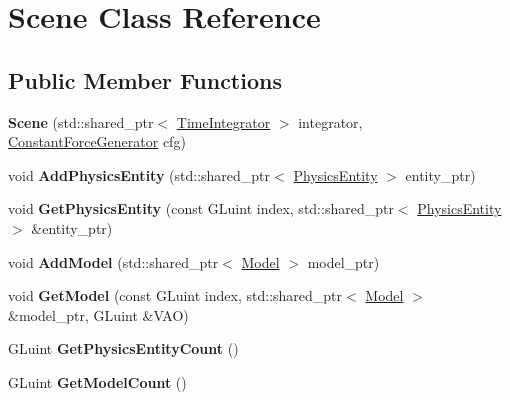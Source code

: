 \hypertarget{classScene}{}\section{Scene Class Reference}
\label{classScene}
\subsection*{Public Member Functions}
\begin{DoxyCompactItemize}
\item 
\mbox{\label{classScene_a0a3d0bcafa5f18639e2af91c4c43115b}} 
{\bfseries Scene} (std\+::shared\+\_\+ptr$<$ \hyperlink{classTimeIntegrator}{Time\+Integrator} $>$ integrator, \hyperlink{classConstantForceGenerator}{Constant\+Force\+Generator} cfg)
\item 
\mbox{\label{classScene_a18477e2b5b504b46f3e7d37908abb98d}} 
void {\bfseries Add\+Physics\+Entity} (std\+::shared\+\_\+ptr$<$ \hyperlink{classPhysicsEntity}{Physics\+Entity} $>$ entity\+\_\+ptr)
\item 
\mbox{\label{classScene_ac20558c7452d933ce3ebe8caa1514702}} 
void {\bfseries Get\+Physics\+Entity} (const G\+Luint index, std\+::shared\+\_\+ptr$<$ \hyperlink{classPhysicsEntity}{Physics\+Entity} $>$ \&entity\+\_\+ptr)
\item 
\mbox{\label{classScene_a5419dc941ee6efc29cd5cef8e7d6d414}} 
void {\bfseries Add\+Model} (std\+::shared\+\_\+ptr$<$ \hyperlink{classModel}{Model} $>$ model\+\_\+ptr)
\item 
\mbox{\label{classScene_a031dc667e4152e4bfd2a8930d31320a4}} 
void {\bfseries Get\+Model} (const G\+Luint index, std\+::shared\+\_\+ptr$<$ \hyperlink{classModel}{Model} $>$ \&model\+\_\+ptr, G\+Luint \&V\+AO)
\item 
\mbox{\label{classScene_a2cadf8fe478a7e3a270902a0536751a9}} 
G\+Luint {\bfseries Get\+Physics\+Entity\+Count} ()
\item 
\mbox{\label{classScene_a406df661eb7be589964dafe76f7f09c8}} 
G\+Luint {\bfseries Get\+Model\+Count} ()
\item 
\mbox{\label{classScene_a5fe443641612290ba78931132d1fddb5}} 

\end{DoxyCompactItemize}
